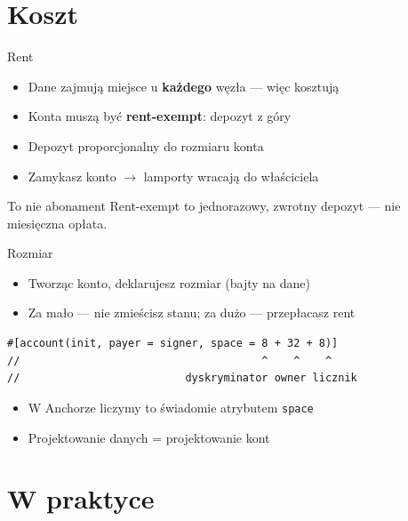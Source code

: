 \section{Koszt}

\begin{frame}{Rent}
  \begin{itemize}
    \item Dane zajmują miejsce u \textbf{każdego} węzła --- więc kosztują
    \item Konta muszą być \textbf{rent-exempt}: depozyt z góry
    \item Depozyt proporcjonalny do rozmiaru konta
    \item Zamykasz konto $\to$ lamporty wracają do właściciela
  \end{itemize}
  \vspace{0.2cm}
  \begin{exampleblock}{To nie abonament}
    Rent-exempt to jednorazowy, zwrotny depozyt --- nie miesięczna opłata.
  \end{exampleblock}
\end{frame}

\begin{frame}[fragile]{Rozmiar}
  \begin{itemize}
    \item Tworząc konto, deklarujesz rozmiar (bajty na dane)
    \item Za mało --- nie zmieścisz stanu; za dużo --- przepłacasz rent
  \end{itemize}
\begin{lstlisting}
#[account(init, payer = signer, space = 8 + 32 + 8)]
//                                      ^    ^    ^
//                          dyskryminator owner licznik
\end{lstlisting}
  \begin{itemize}
    \item W Anchorze liczymy to świadomie atrybutem \texttt{space}
    \item Projektowanie danych = projektowanie kont
  \end{itemize}
\end{frame}

\section{W praktyce}

